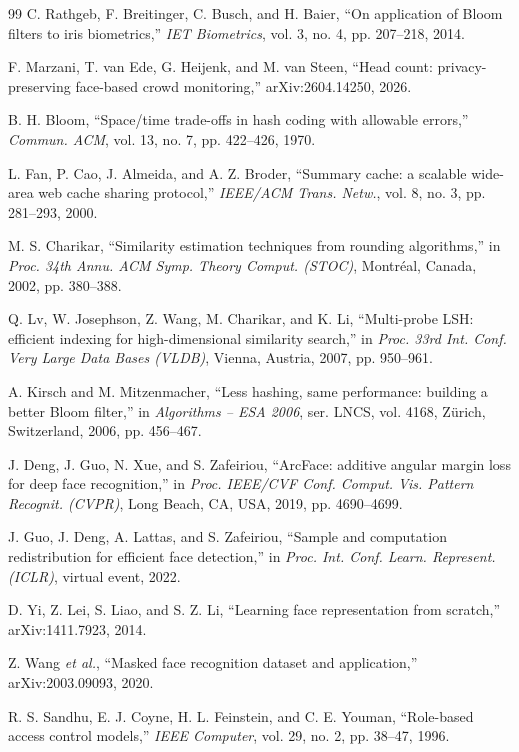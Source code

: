 \documentclass[12pt,a4paper,oneside]{report}
\begin{document}
\begin{thebibliography}{99}
C. Rathgeb, F. Breitinger, C. Busch, and H. Baier,
``On application of Bloom filters to iris biometrics,''
\textit{IET Biometrics},
vol. 3, no. 4, pp. 207--218,
2014.

F. Marzani, T. van Ede, G. Heijenk, and M. van Steen,
``Head count: privacy-preserving face-based crowd monitoring,''
arXiv:2604.14250, 2026.

B. H. Bloom,
``Space/time trade-offs in hash coding with allowable errors,''
\textit{Commun. ACM},
vol. 13, no. 7, pp. 422--426,
1970.

L. Fan, P. Cao, J. Almeida, and A. Z. Broder,
``Summary cache: a scalable wide-area web cache sharing protocol,''
\textit{IEEE/ACM Trans. Netw.},
vol. 8, no. 3, pp. 281--293,
2000.

M. S. Charikar,
``Similarity estimation techniques from rounding algorithms,''
in \textit{Proc. 34th Annu. ACM Symp. Theory Comput. (STOC)},
Montr\'eal, Canada, 2002, pp. 380--388.

Q. Lv, W. Josephson, Z. Wang, M. Charikar, and K. Li,
``Multi-probe LSH: efficient indexing for high-dimensional similarity search,''
in \textit{Proc. 33rd Int. Conf. Very Large Data Bases (VLDB)},
Vienna, Austria, 2007, pp. 950--961.

A. Kirsch and M. Mitzenmacher,
``Less hashing, same performance: building a better Bloom filter,''
in \textit{Algorithms -- ESA 2006}, ser. LNCS, vol. 4168,
Z\"urich, Switzerland, 2006, pp. 456--467.

J. Deng, J. Guo, N. Xue, and S. Zafeiriou,
``ArcFace: additive angular margin loss for deep face recognition,''
in \textit{Proc. IEEE/CVF Conf. Comput. Vis. Pattern Recognit. (CVPR)},
Long Beach, CA, USA, 2019, pp. 4690--4699.

J. Guo, J. Deng, A. Lattas, and S. Zafeiriou,
``Sample and computation redistribution for efficient face detection,''
in \textit{Proc. Int. Conf. Learn. Represent. (ICLR)},
virtual event, 2022.

D. Yi, Z. Lei, S. Liao, and S. Z. Li,
``Learning face representation from scratch,''
arXiv:1411.7923, 2014.

Z. Wang \textit{et al.},
``Masked face recognition dataset and application,''
arXiv:2003.09093, 2020.

R. S. Sandhu, E. J. Coyne, H. L. Feinstein, and C. E. Youman,
``Role-based access control models,''
\textit{IEEE Computer},
vol. 29, no. 2, pp. 38--47,
1996.


\end{thebibliography}
\end{document}
